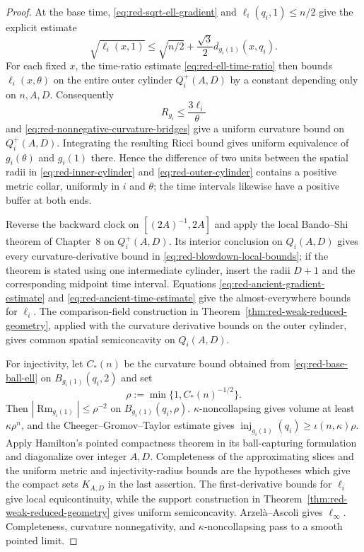 \documentclass[10pt]{coll-l}
\newcommand{\inj}{\operatorname{inj}}
\theoremstyle{definition}
\theoremstyle{remark}
\numberwithin{section}{chapter}
\numberwithin{equation}{chapter}
\newcommand{\Rm}{\operatorname{Rm}}
\begin{document}
\begin{proof}
At the base time, \eqref{eq:red-sqrt-ell-gradient} and
$\ell_i(q_i,1)\leq n/2$ give the explicit estimate
\begin{equation}
 \sqrt{\ell_i(x,1)}
 \leq\sqrt{n/2}+\frac{\sqrt3}{2}
              d_{g_i(1)}(x,q_i).                       \label{eq:red-base-ball-ell}
\end{equation}
For each fixed $x$, the time-ratio estimate
\eqref{eq:red-ell-time-ratio} then bounds $\ell_i(x,\theta)$ on the entire
outer cylinder $Q_i^+(A,D)$ by a constant depending only on $n,A,D$.
Consequently
\begin{equation}
                         R_{g_i}\leq\frac{3\ell_i}\theta
                                                               \label{eq:red-blowdown-R-bound}
\end{equation}
and \eqref{eq:red-nonnegative-curvature-bridges} give a uniform curvature
bound on $Q_i^+(A,D)$.  Integrating the resulting Ricci bound gives uniform
equivalence of $g_i(\theta)$ and $g_i(1)$ there.  Hence the difference of two
units between the spatial radii in \eqref{eq:red-inner-cylinder} and
\eqref{eq:red-outer-cylinder} contains a positive metric collar, uniformly
in $i$ and $\theta$; the time intervals likewise have a positive buffer at
both ends.

Reverse the backward clock on $[(2A)^{-1},2A]$ and apply the local
Bando--Shi theorem of Chapter~8 on $Q_i^+(A,D)$.  Its interior conclusion on
$Q_i(A,D)$ gives every curvature-derivative bound in
\eqref{eq:red-blowdown-local-bounds}; if the theorem is stated using one
intermediate cylinder, insert the radii $D+1$ and the corresponding midpoint
time interval.  Equations \eqref{eq:red-ancient-gradient-estimate} and
\eqref{eq:red-ancient-time-estimate} give the almost-everywhere bounds for
$\ell_i$.  The comparison-field construction in
Theorem~\ref{thm:red-weak-reduced-geometry}, applied with the curvature
derivative bounds on the outer cylinder, gives common spatial
semiconcavity on $Q_i(A,D)$.

For injectivity, let $C_*(n)$ be the curvature bound obtained from
\eqref{eq:red-base-ball-ell} on
$B_{g_i(1)}(q_i,2)$ and set
\begin{equation}
                 \rho:=\min\{1,C_*(n)^{-1/2}\}.        \label{eq:red-injectivity-scale}
\end{equation}
Then $|\Rm_{g_i(1)}|\leq\rho^{-2}$ on
$B_{g_i(1)}(q_i,\rho)$.
$\kappa$-noncollapsing gives volume at least $\kappa\rho^n$, and the
Cheeger--Gromov--Taylor estimate gives
$\inj_{g_i(1)}(q_i)\geq\iota(n,\kappa)\rho$.
Apply Hamilton's
pointed compactness theorem in its ball-capturing formulation and diagonalize
over integer $A,D$.  Completeness of the approximating slices and the
uniform metric and injectivity-radius bounds are the hypotheses which give
the compact sets $K_{A,D}$ in the last assertion.  The
first-derivative bounds for $\ell_i$ give local equicontinuity, while the
support construction in Theorem~\ref{thm:red-weak-reduced-geometry} gives
uniform semiconcavity.  Arzel\`a--Ascoli gives $\ell_\infty$.  Completeness,
curvature nonnegativity, and $\kappa$-noncollapsing pass to a smooth pointed
limit.
\end{proof}
\end{document}
